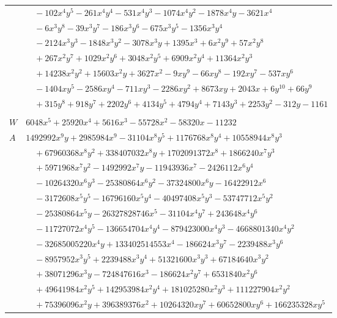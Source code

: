 \documentclass[11pt]{article}
\begin{document}
\begin{longtable}{@{}ll@{}}
 & $\quad -102x^{4}y^{5}-261x^{4}y^{4}-531x^{4}y^{3}-1074x^{4}y^{2}-1878x^{4}y-3621x^{4}$\\
 & $\quad -6x^{3}y^{8}-39x^{3}y^{7}-186x^{3}y^{6}-675x^{3}y^{5}-1356x^{3}y^{4}$\\
 & $\quad -2124x^{3}y^{3}-1848x^{3}y^{2}-3078x^{3}y+1395x^{3}+6x^{2}y^{9}+57x^{2}y^{8}$\\
 & $\quad +267x^{2}y^{7}+1029x^{2}y^{6}+3048x^{2}y^{5}+6909x^{2}y^{4}+11364x^{2}y^{3}$\\
 & $\quad +14238x^{2}y^{2}+15603x^{2}y+3627x^{2}-9xy^{9}-66xy^{8}-192xy^{7}-537xy^{6}$\\
 & $\quad -1404xy^{5}-2586xy^{4}-711xy^{3}-2286xy^{2}+8673xy+2043x+6y^{10}+66y^{9}$\\
 & $\quad +315y^{8}+918y^{7}+2202y^{6}+4134y^{5}+4794y^{4}+7143y^{3}+2253y^{2}-312y-1161$\\
\addlinespace[3pt]
\multicolumn{2}{@{}l}{$g=2$, $i=27$, $m=432$, neighbours $6,8,9,10,12,13,19,20,21,33,37$}\\
$W$ & $6048x^{5}+25920x^{4}+5616x^{3}-55728x^{2}-58320x-11232$\\
$A$ & $1492992x^{9}y+2985984x^{9}-31104x^{8}y^{5}+1176768x^{8}y^{4}+10558944x^{8}y^{3}$\\
 & $\quad +67960368x^{8}y^{2}+338407032x^{8}y+1702091372x^{8}+1866240x^{7}y^{3}$\\
 & $\quad +5971968x^{7}y^{2}-1492992x^{7}y-11943936x^{7}-2426112x^{6}y^{4}$\\
 & $\quad -10264320x^{6}y^{3}-25380864x^{6}y^{2}-37324800x^{6}y-16422912x^{6}$\\
 & $\quad -3172608x^{5}y^{5}-16796160x^{5}y^{4}-40497408x^{5}y^{3}-53747712x^{5}y^{2}$\\
 & $\quad -25380864x^{5}y-26327828746x^{5}-31104x^{4}y^{7}+243648x^{4}y^{6}$\\
 & $\quad -11727072x^{4}y^{5}-136654704x^{4}y^{4}-879423000x^{4}y^{3}-4668801340x^{4}y^{2}$\\
 & $\quad -32685005220x^{4}y+133402514553x^{4}-186624x^{3}y^{7}-2239488x^{3}y^{6}$\\
 & $\quad -8957952x^{3}y^{5}+2239488x^{3}y^{4}+51321600x^{3}y^{3}+67184640x^{3}y^{2}$\\
 & $\quad +38071296x^{3}y-724847616x^{3}-186624x^{2}y^{7}+6531840x^{2}y^{6}$\\
 & $\quad +49641984x^{2}y^{5}+142953984x^{2}y^{4}+181025280x^{2}y^{3}+111227904x^{2}y^{2}$\\
 & $\quad +75396096x^{2}y+396389376x^{2}+10264320xy^{7}+60652800xy^{6}+166235328xy^{5}$\\

\end{longtable}
\end{document}
